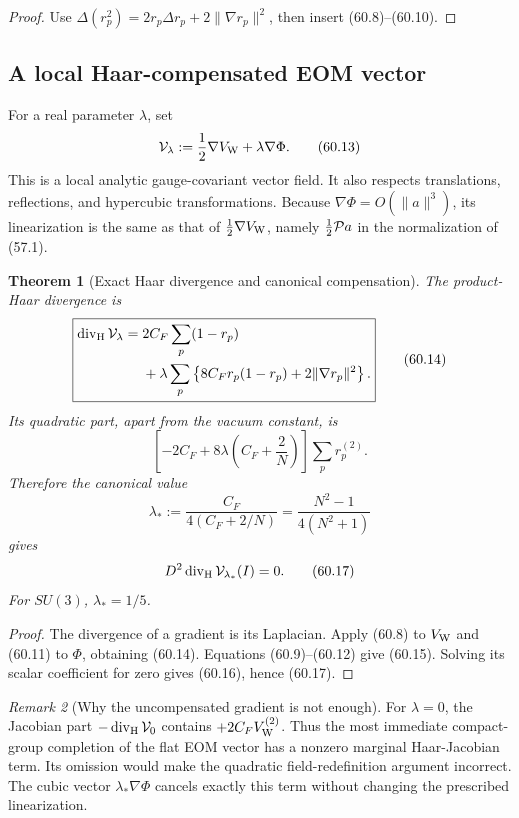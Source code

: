 \documentclass[11pt,oneside]{book}
\newtheorem{theorem}{Theorem}[chapter]
\theoremstyle{definition}
\theoremstyle{remark}
\newtheorem{remark}[theorem]{Remark}
\begin{document}
\begin{proof}
Use
\(\Delta(r_p^2)=2r_p\Delta r_p+2\|\nabla r_p\|^2\), then
insert (60.8)--(60.10).
\end{proof}

\subsection{A local Haar-compensated EOM vector}

For a real parameter \(\lambda\), set
\[
 {\cal V}_\lambda
 :=\frac12\nabla V_{\rm W}+\lambda\nabla\Phi.               \tag{60.13}
\]
This is a local analytic gauge-covariant vector field.  It also
respects translations, reflections, and hypercubic transformations.
Because \(\nabla\Phi=O(\|a\|^3)\), its linearization is the same
as that of \(\frac12\nabla V_{\rm W}\), namely
\(\frac12{\cal P}a\) in the normalization of (57.1).

\begin{theorem}[Exact Haar divergence and canonical compensation]
\label{thm:e8v60-compensated-divergence}
The product-Haar divergence is
\[
\boxed{\begin{split}
 \operatorname{div}_{\rm H}{\cal V}_\lambda
 ={}&2C_F\sum_p(1-r_p)\\
 &+\lambda\sum_p\left\{8C_Fr_p(1-r_p)
                         +2\|\nabla r_p\|^2\right\}.
\end{split}}                                                  \tag{60.14}
\]
Its quadratic part, apart from the vacuum constant, is
\[
 \left[-2C_F+8\lambda\left(C_F+\frac2N\right)\right]
 \sum_pr_p^{(2)}.                                            \tag{60.15}
\]
Therefore the canonical value
\[
 \boxed{
 \lambda_*:=\frac{C_F}{4(C_F+2/N)}
 =\frac{N^2-1}{4(N^2+1)}}                                   \tag{60.16}
\]
gives
\[
 D^2\operatorname{div}_{\rm H}{\cal V}_{\lambda_*}(I)=0.
                                                                    \tag{60.17}
\]
For \(SU(3)\), \(\lambda_*=1/5\).
\end{theorem}

\begin{proof}
The divergence of a gradient is its Laplacian.  Apply (60.8) to
\(V_{\rm W}\) and (60.11) to \(\Phi\), obtaining (60.14).
Equations (60.9)--(60.12) give (60.15).  Solving its scalar
coefficient for zero gives (60.16), hence (60.17).
\end{proof}

\begin{remark}[Why the uncompensated gradient is not enough]
\label{rem:e8v60-uncompensated-feed}
For \(\lambda=0\), the Jacobian part
\(-\operatorname{div}_{\rm H}{\cal V}_0\) contains
\(+2C_FV_{\rm W}^{(2)}\).  Thus the most immediate compact-group
completion of the flat EOM vector has a nonzero marginal
Haar-Jacobian term.  Its omission would make the quadratic
field-redefinition argument incorrect.  The cubic vector
\(\lambda_*\nabla\Phi\) cancels exactly this term without changing
the prescribed linearization.
\end{remark}
\end{document}
